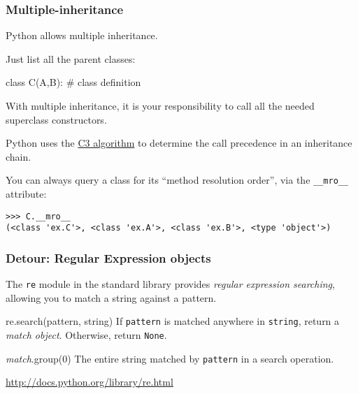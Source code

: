 \documentclass[english,serif,mathserif,xcolor=pdftex,dvipsnames,table]{beamer}
\begin{document}
\begin{frame}[fragile]
  \frametitle{Multiple-inheritance}
  Python allows multiple inheritance.

  \+
  Just list all the parent classes:
  \begin{python}
class C(A,B):
  # class definition
  \end{python}

  \+
  With multiple inheritance, it is your responsibility to call all the
  needed superclass constructors.

  \+
  Python uses the
  \href{http://www.python.org/download/releases/2.3/mro/}{C3
    algorithm} to determine the call precedence in an inheritance
  chain.

  \+
  You can always query a class for its ``method resolution order'',
  via the \lstinline|__mro__| attribute:
  \begin{lstlisting}[basicstyle=\scriptsize\ttfamily]
>>> C.__mro__
(<class 'ex.C'>, <class 'ex.A'>, <class 'ex.B'>, <type 'object'>)
  \end{lstlisting}
\end{frame}


\begin{frame}
  \frametitle{Detour: Regular Expression objects}
  The \texttt{re} module in the standard library provides
  \emph{regular expression searching}, allowing you to match a string
  against a pattern.

  \+
  \begin{describe}{re.search(pattern, string)}
    If \texttt{pattern} is matched anywhere in \texttt{string}, return
    a \emph{match object}.  Otherwise, return \texttt{None}.
  \end{describe}

  \+
  \begin{describe}{\emph{match}.group(0)}
    The entire string matched by \texttt{pattern} in a search operation.
  \end{describe}

  \+
  \begin{references}
    \url{http://docs.python.org/library/re.html}
  \end{references}
\end{frame}
\end{document}
